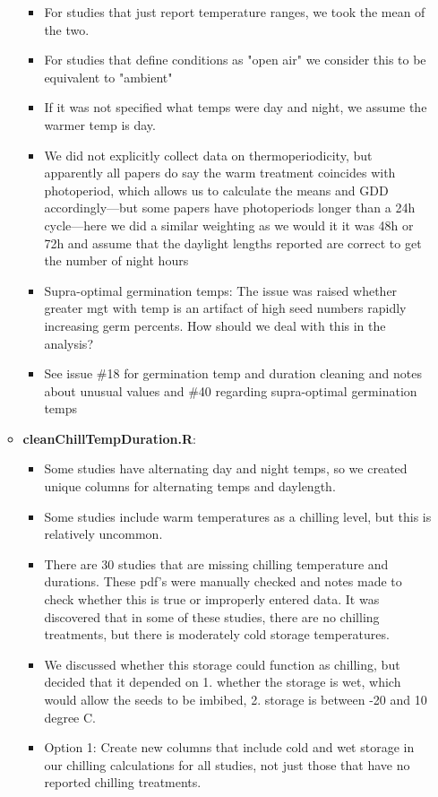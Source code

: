 \documentclass{article}[12pt]
\begin{document}
\begin{enumerate}
\begin{itemize}
\begin{itemize}
\item For studies that just report temperature ranges, we took the mean of the two. 
\item For studies that define conditions as "open air" we consider this to be equivalent to "ambient"
\item If it was not specified what temps were day and night, we assume the warmer temp is day. 
\item We did not explicitly collect data on thermoperiodicity, but apparently all papers do say the warm treatment coincides with photoperiod, which allows us to calculate the means and GDD accordingly---but some papers have photoperiods longer than a 24h cycle---here we did a similar weighting as we would it it was 48h or 72h and assume that the daylight lengths reported are correct to get the number of night hours 
\item Supra-optimal germination temps: The issue was raised whether greater mgt with temp is an artifact of high seed numbers rapidly increasing germ percents. How should we deal with this in the analysis?
\item See issue \#18 for germination temp and duration cleaning and notes about unusual values and \#40 regarding supra-optimal germination temps
\end{itemize}
\item \textbf{cleanChillTempDuration.R}: 
\begin{itemize}
\item Some studies have alternating day and night temps, so we created unique columns for alternating temps and daylength. 
\item Some studies include warm temperatures as a chilling level, but this is relatively uncommon. 
\item There are 30 studies that are missing chilling temperature and durations. These pdf's were manually checked and notes made to check whether this is true or improperly entered data. It was discovered that in some of these studies, there are no chilling treatments, but there is moderately cold storage temperatures. 
\item We discussed whether this storage could function as chilling, but decided that it depended on 1. whether the storage is wet, which would allow the seeds to be imbibed, 2. storage is between -20 and 10 degree C. 
\item Option 1: Create new columns that include cold and wet storage in our chilling calculations for all studies, not just those that have no reported chilling treatments.

\end{itemize}
\end{itemize}
\end{enumerate}
\end{document}
